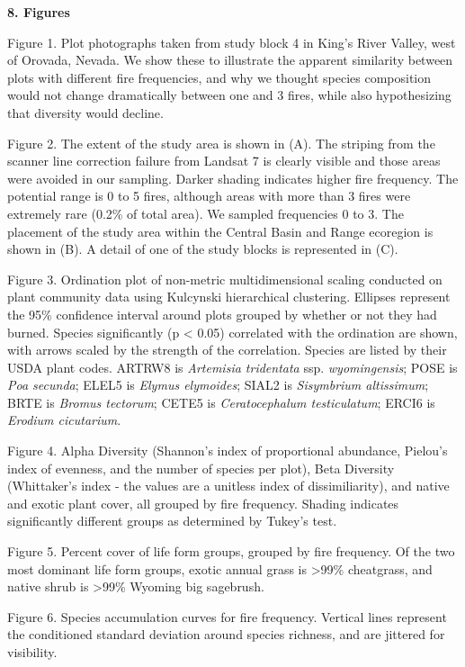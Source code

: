 \documentclass[]{article}
\title{}
\author{}
\date{}
\begin{document}
\textbf{8. Figures}

Figure 1. Plot photographs taken from study block 4 in King's River
Valley, west of Orovada, Nevada. We show these to illustrate the
apparent similarity between plots with different fire frequencies, and
why we thought species composition would not change dramatically between
one and 3 fires, while also hypothesizing that diversity would decline.

Figure 2. The extent of the study area is shown in (A). The striping
from the scanner line correction failure from Landsat 7 is clearly
visible and those areas were avoided in our sampling. Darker shading
indicates higher fire frequency. The potential range is 0 to 5 fires,
although areas with more than 3 fires were extremely rare (0.2\% of
total area). We sampled frequencies 0 to 3. The placement of the study
area within the Central Basin and Range ecoregion is shown in (B). A
detail of one of the study blocks is represented in (C).

Figure 3. Ordination plot of non-metric multidimensional scaling
conducted on plant community data using Kulcynski hierarchical
clustering. Ellipses represent the 95\% confidence interval around plots
grouped by whether or not they had burned. Species significantly (p
\textless{} 0.05) correlated with the ordination are shown, with arrows
scaled by the strength of the correlation. Species are listed by their
USDA plant codes. ARTRW8 is \emph{Artemisia tridentata} ssp.
\emph{wyomingensis}; POSE is \emph{Poa secunda}; ELEL5 is \emph{Elymus
elymoides}; SIAL2 is \emph{Sisymbrium altissimum}; BRTE is \emph{Bromus
tectorum}; CETE5 is \emph{Ceratocephalum testiculatum}; ERCI6 is
\emph{Erodium cicutarium}.

Figure 4. Alpha Diversity (Shannon's index of proportional abundance,
Pielou's index of evenness, and the number of species per plot), Beta
Diversity (Whittaker's index - the values are a unitless index of
dissimiliarity), and native and exotic plant cover, all grouped by fire
frequency. Shading indicates significantly different groups as
determined by Tukey's test.

Figure 5. Percent cover of life form groups, grouped by fire frequency.
Of the two most dominant life form groups, exotic annual grass is
\textgreater{}99\% cheatgrass, and native shrub is \textgreater{}99\%
Wyoming big sagebrush.

Figure 6. Species accumulation curves for fire frequency. Vertical lines
represent the conditioned standard deviation around species richness,
and are jittered for visibility.
\end{document}
